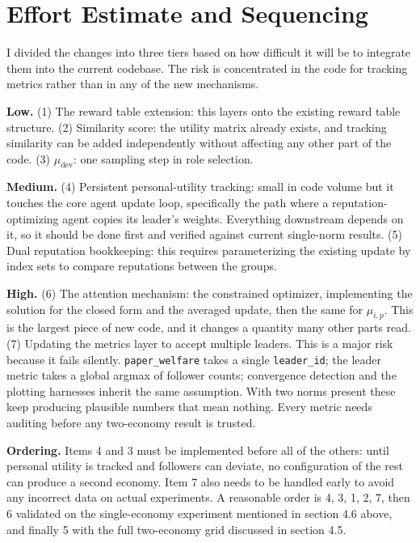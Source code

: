 \documentclass[12pt]{article}
\begin{document}
\section{Effort Estimate and Sequencing}
 
I divided the changes into three tiers based on how difficult it will be to integrate them into the current codebase.
The risk is concentrated in the code for tracking metrics rather than in any
of the new mechanisms.
 
\textbf{Low.} (1) The reward table extension: this layers onto the existing reward table structure. (2) Similarity score: the
utility matrix already exists, and tracking similarity can be added independently without affecting any other part of the code. (3) $\mu_\text{dev}$: one sampling
step in role selection.
 
\textbf{Medium.} (4) Persistent personal-utility tracking: small in code volume but it touches the core
agent update loop, specifically the path where a reputation-optimizing agent copies its leader's weights.
Everything downstream depends on it, so it should be done first and verified against current single-norm
results. (5) Dual reputation bookkeeping: this requires parameterizing the existing update by index sets to compare reputations
between the groups.
 
\textbf{High.} (6) The attention mechanism: the constrained optimizer, implementing the solution for the closed form and the averaged
update, then the same for $\mu_{i,p}$. This is the largest piece of new code, and it changes a quantity many
other parts read. (7) Updating the metrics layer to accept multiple leaders. This is a major risk because 
it fails silently. \texttt{paper\_welfare} takes a single \texttt{leader\_id}; the
leader metric takes a global argmax of follower counts; convergence detection and the plotting harnesses
inherit the same assumption. With two norms present these keep producing plausible numbers that mean
nothing. Every metric needs auditing before any two-economy result is trusted.
 
\textbf{Ordering.} Items 4 and 3 must be implemented before all of the others: until personal utility is tracked and followers can
deviate, no configuration of the rest can produce a second economy. Item 7 also needs to be handled early to avoid any incorrect data
on actual experiments. A reasonable order is
4, 3, 1, 2, 7, then 6 validated on the single-economy experiment mentioned in section 4.6 above, and finally 5 with the full
two-economy grid discussed in section 4.5.
\end{document}
